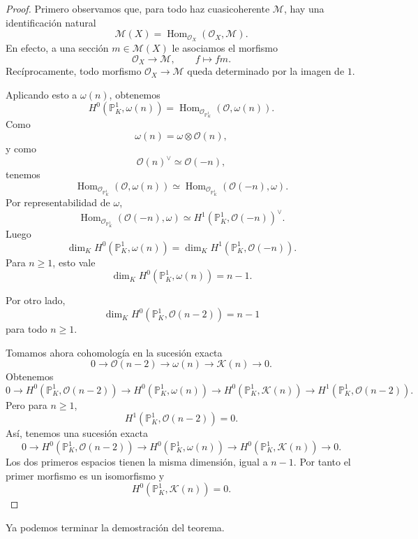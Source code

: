\begin{proof}
Primero observamos que, para todo haz cuasicoherente $\mathcal{M}$, hay una identificación natural
\[
\mathcal{M}(X)=
\operatorname{Hom}_{\mathcal{O}_X}(\mathcal{O}_X,\mathcal{M}).
\]
En efecto, a una sección $m\in \mathcal{M}(X)$ le asociamos el morfismo
\[
\mathcal{O}_X\longrightarrow \mathcal{M},
\qquad
f\longmapsto fm.
\]
Recíprocamente, todo morfismo $\mathcal{O}_X\to \mathcal{M}$ queda determinado por la imagen de $1$.

Aplicando esto a $\omega(n)$, obtenemos
\[
H^0(\mathbb{P}^1_K,\omega(n))=
\operatorname{Hom}_{\mathcal{O}_{\mathbb{P}^1_K}}(\mathcal{O},\omega(n)).
\]
Como
\[
\omega(n)=\omega\otimes\mathcal{O}(n),
\]
y como
\[
\mathcal{O}(n)^\vee\simeq \mathcal{O}(-n),
\]
tenemos
\[
\operatorname{Hom}_{\mathcal{O}_{\mathbb{P}^1_K}}(\mathcal{O},\omega(n))
\simeq
\operatorname{Hom}_{\mathcal{O}_{\mathbb{P}^1_K}}(\mathcal{O}(-n),\omega).
\]
Por representabilidad de $\omega$,
\[
\operatorname{Hom}_{\mathcal{O}_{\mathbb{P}^1_K}}(\mathcal{O}(-n),\omega)
\simeq
H^1(\mathbb{P}^1_K,\mathcal{O}(-n))^\vee.
\]
Luego
\[
\dim_K H^0(\mathbb{P}^1_K,\omega(n))
=
\dim_K H^1(\mathbb{P}^1_K,\mathcal{O}(-n)).
\]
Para $n\ge 1$, esto vale
\[
\dim_K H^0(\mathbb{P}^1_K,\omega(n))=n-1.
\]

Por otro lado,
\[
\dim_K H^0(\mathbb{P}^1_K,\mathcal{O}(n-2))=n-1
\]
para todo $n\ge 1$.

Tomamos ahora cohomología en la sucesión exacta
\[
0\longrightarrow \mathcal{O}(n-2)
\longrightarrow \omega(n)
\longrightarrow \mathcal{K}(n)
\longrightarrow 0.
\]
Obtenemos
\[
0\longrightarrow
H^0(\mathbb{P}^1_K,\mathcal{O}(n-2))
\longrightarrow
H^0(\mathbb{P}^1_K,\omega(n))
\longrightarrow
H^0(\mathbb{P}^1_K,\mathcal{K}(n))
\longrightarrow
H^1(\mathbb{P}^1_K,\mathcal{O}(n-2)).
\]
Pero para $n\ge 1$,
\[
H^1(\mathbb{P}^1_K,\mathcal{O}(n-2))=0.
\]
Así, tenemos una sucesión exacta
\[
0\longrightarrow
H^0(\mathbb{P}^1_K,\mathcal{O}(n-2))
\longrightarrow
H^0(\mathbb{P}^1_K,\omega(n))
\longrightarrow
H^0(\mathbb{P}^1_K,\mathcal{K}(n))
\longrightarrow 0.
\]
Los dos primeros espacios tienen la misma dimensión, igual a $n-1$. Por tanto el primer morfismo es un isomorfismo y
\[
H^0(\mathbb{P}^1_K,\mathcal{K}(n))=0.
\]
\end{proof}

Ya podemos terminar la demostración del teorema.


